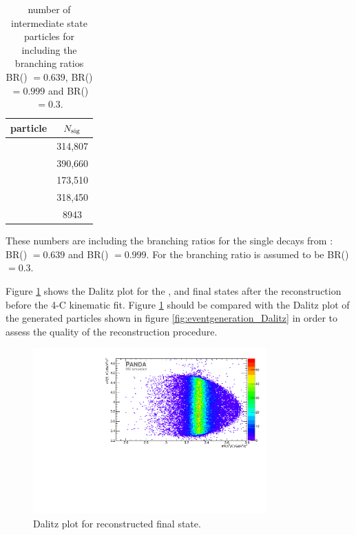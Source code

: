 	 \begin{table}
		\centering
		\caption{\propose number of intermediate state particles for \mychannel including the branching ratios BR(\decay{\alam}{\piplus}{\antiproton}) $=0.639$, BR(\decay{\anticascade}{\alam}{\piplus})
		 $= 0.999$ and BR(\decay{\excitedanticascade}{\alam}{\kplus}) $=0.3$.}
		 \label{tab:nsig_cc}
		 
		 \begin{tabular}{lc}
		 	\hline
		 	particle & $N_{\textnormal{sig}}$ \\\hline
		 	\hline
		 	\lam & 314,807 \\
		 	\alam & 390,660 \\ 
		 	\cascade & 173,510 \\ 
		 	\excitedanticascade & 318,450 \\
		 	\excitedanticascade \cascade &  8943\\\hline 
		 	
		 \end{tabular}
	\end{table}
	
	 
	
	These numbers are including the branching ratios for the single decays from \cite{PDG}: BR() $=0.639$ 
	and BR(\decay{\cascade}{\lam}{\piminus}) $= 0.999$. 
	For \excitedcascade the branching ratio is assumed to be BR(\decay{\excitedcascade}{\lam}{\kminus}) $=0.3$. 
	
	Figure \ref{fig:reco_Dalitzplot} shows the Dalitz plot for the \anticascade, \lam and \kminus final states after the reconstruction before the 4-C kinematic fit. 
	Figure \ref{fig:reco_Dalitzplot} should be compared with the Dalitz plot of the generated particles shown in figure \ref{fig:eventgeneration_Dalitz}
	in order to assess the quality of the reconstruction procedure.
	
	\begin{figure}
		\centering
		\includegraphics[width=0.8\textwidth]{./plots/pbarp/Dalitzplot_reco.pdf}
		\caption{\propose Dalitz plot for reconstructed \anticascade\lam\kminus final state.}
		\label{fig:reco_Dalitzplot}
	
	\end{figure}
	
	